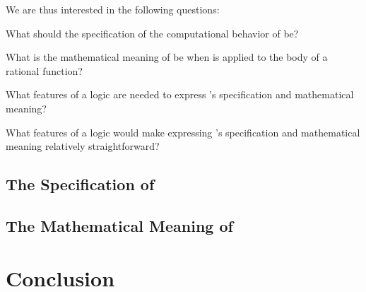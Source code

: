 \documentclass[fleqn]{llncs}
\begin{document}

We are thus interested in the following questions:

\be

  \item What should the specification of the computational behavior of
    {\NRE} be?

  \item What is the mathematical meaning of {\NRE} be when {\NRE} is
    applied to the body of a rational function?

  \item What features of a logic are needed to express
    {\NRE}'s specification and mathematical meaning?

  \item What features of a logic would make expressing {\NRE}'s
    specification and mathematical meaning relatively straightforward?

\ee

\subsection{The Specification of {\NRE}}

\subsection{The Mathematical Meaning of {\NRE}}

\section{Conclusion}




\setcounter{tocdepth}{1}
\listoftodos
\setcounter{tocdepth}{0}
\end{document}
